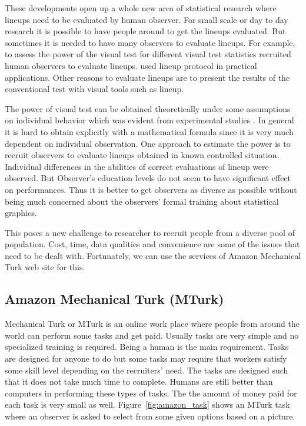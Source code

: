 \documentclass[11pt]{article}
\begin{document}
These developments open up a whole new area of statistical research where lineups need to be evaluated by human observer. For small scale or day to day research it is possible to have people around to get the lineups evaluated. But sometimes it is needed to have many observers to evaluate lineups. For example, to assess the power of the visual test for different visual test statistics \cite{heike:2012} recruited human observers to evaluate lineups.   \cite{niladri:2012} used lineup protocol in practical applications. Other reasons to evaluate lineups are to present the results of the conventional test with visual tools such as lineup.  




The power of visual test can be obtained theoretically under some assumptions on individual behavior which was evident from experimental studies \citep{majumder:2013}. In general it is hard to obtain explicitly with a mathematical formula since it is very much dependent on individual observation. One approach to estimate the power is to recruit observers to evaluate lineups obtained in known controlled situation. Individual differences in the abilities of correct evaluations of lineup were observed. But Observer's education levels do not seem to have significant effect on performances. Thus it is better to get observers as diverse as possible without being much concerned about the observers' formal training about statistical graphics.

This poses a new challenge to researcher to recruit people from a diverse pool of population. Cost, time, data qualities and convenience are some of the issues that need to be dealt with. Fortunately, we can use the services of Amazon Mechanical Turk web site for this.  

\subsection{Amazon Mechanical Turk (MTurk)}

\cite{turk} Mechanical Turk  or MTurk is an online work place where people from around the world can perform some tasks and get paid. Usually tasks are very simple and no specialized training is required. Being a human is the main requirement. Tasks are designed for anyone to do but some tasks may require that workers satisfy some skill level depending on the recruiters' need. The tasks are designed such that it does not take much time to complete. Humans are still better than computers in performing these types of tasks. The the amount of money paid for each task is very small as well. Figure~\ref{fig:amazon_task} shows an MTurk task where an observer is asked to select from some given options based on a picture. 
\end{document}
